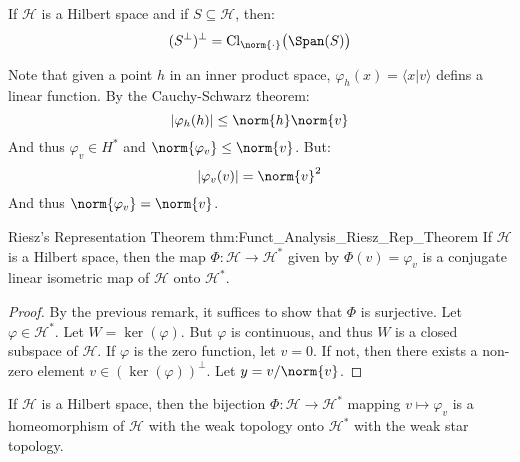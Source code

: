 \documentclass[crop=false,class=book,oneside]{standalone}                      %
\begin{document}
        \begin{theorem}
            If $\mathcal{H}$ is a Hilbert space and if
            $S\subseteq\mathcal{H}$, then:
            \begin{equation}
                (S^{\perp})^{\perp}
                =\mathrm{Cl}_{\norm{\cdot}}\big(\Span(S)\big)
            \end{equation}
        \end{theorem}
        Note that given a point $h$ in an inner product space,
        $\varphi_{h}(x)=\langle{x|v}\rangle$ defins a linear
        function. By the Cauchy-Schwarz theorem:
        \begin{equation}
            |\varphi_{h}(h)|\leq\norm{h}\norm{v}
        \end{equation}
        And thus $\varphi_{v}\in{H}^{*}$ and
        $\norm{\varphi_{v}}\leq\norm{v}$. But:
        \begin{equation}
            |\varphi_{v}(v)|=\norm{v}^{2}
        \end{equation}
        And thus $\norm{\varphi_{v}}=\norm{v}$.
        \begin{ltheorem}{Riesz's Representation Theorem}
              {thm:Funct_Analysis_Riesz_Rep_Theorem}
            If $\mathcal{H}$ is a Hilbert space, then the
            map $\Phi:\mathcal{H}\rightarrow\mathcal{H}^{*}$
            given by $\Phi(v)=\varphi_{v}$ is a conjugate
            linear isometric map of $\mathcal{H}$ onto
            $\mathcal{H}^{*}$.
        \end{ltheorem}
        \begin{proof}
            By the previous remark, it suffices to show that
            $\Phi$ is surjective. Let $\varphi\in\mathcal{H}^{*}$.
            Let $W=\ker(\varphi)$. But $\varphi$ is continuous,
            and thus $W$ is a closed subspace of $\mathcal{H}$.
            If $\varphi$ is the zero function, let $v=0$. If not,
            then there exists a non-zero element
            $v\in(\ker(\varphi))^{\perp}$. Let
            $y=v/\norm{v}$.
        \end{proof}
        \begin{theorem}
            If $\mathcal{H}$ is a Hilbert space, then the
            bijection $\Phi:\mathcal{H}\rightarrow\mathcal{H}^{*}$
            mapping $v\mapsto\varphi_{v}$ is a homeomorphism
            of $\mathcal{H}$ with the weak topology onto
            $\mathcal{H}^{*}$ with the weak star topology.
        \end{theorem}
\end{document}
